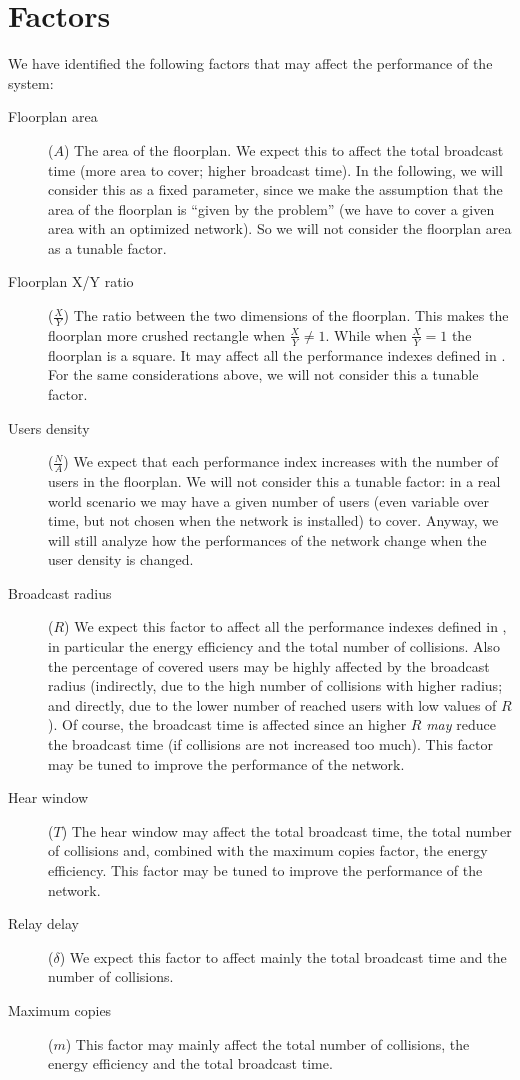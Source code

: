 \section{Factors}\label{sec:factors}

We have identified the following factors that may affect the performance of the
system:
\begin{description}
	\item[Floorplan area] (\(A\)) The area of the floorplan. We expect this
		to affect the total broadcast time (more area to cover; higher
		broadcast time). In the following, we will consider this as a
		fixed parameter, since we make the assumption that the area of
		the floorplan is ``given by the problem'' (we have to cover a
		given area with an optimized network). So we will not consider
		the floorplan area as a tunable factor.
	\item[Floorplan X/Y ratio] (\(\frac{X}{Y}\)) The ratio between the two
		dimensions of the floorplan. This makes the floorplan more
		crushed rectangle when \(\frac{X}{Y} \neq 1\). While when
		\(\frac{X}{Y} = 1\) the floorplan is a square. It may affect all
		the performance indexes defined in . For the
		same considerations above, we will not consider this a tunable
		factor.
	\item[Users density] (\(\frac{N}{A}\)) We expect that each performance
		index increases with the number of users in the floorplan. We
		will not consider this a tunable factor: in a real world
		scenario we may have a given number of users (even variable over
		time, but not chosen when the network is installed) to cover.
		Anyway, we will still analyze how the performances of the
		network change when the user density is changed.
	\item[Broadcast radius] (\(R\)) We expect this factor to affect all the
		performance indexes defined in , in
		particular the energy efficiency and the total number of
		collisions. Also the percentage of covered users may be highly
		affected by the broadcast radius (indirectly, due to the high
		number of collisions with higher radius; and directly, due to
		the lower number of reached users with low values of \(R\)). Of
		course, the broadcast time is affected since an higher \(R\)
		\emph{may} reduce the broadcast time (if collisions are not
		increased too much).
		This factor may be tuned to improve the performance of the
		network.
	\item[Hear window] (\(T\)) The hear window may affect the total
		broadcast time, the total number of collisions and, combined
		with the maximum copies factor, the energy efficiency. This
		factor may be tuned to improve the performance of the network.
	\item[Relay delay] (\(\delta\)) We expect this factor to affect mainly
		the total broadcast time and the number of collisions.
	\item[Maximum copies] (\(m\)) This factor may mainly affect the total
		number of collisions, the energy efficiency and the total
		broadcast time.
\end{description}
